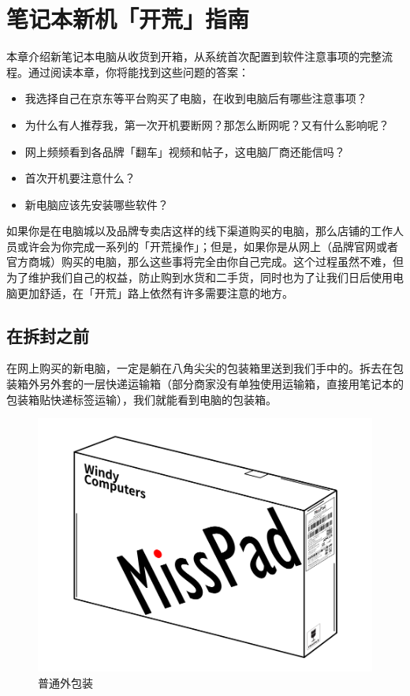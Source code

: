 \chapter{笔记本新机「开荒」指南}
\label{cha:new-laptop-setup}

\begin{intro}
  本章介绍新笔记本电脑从收货到开箱，从系统首次配置到软件注意事项的完整流程。通过阅读本章，你将能找到这些问题的答案：
  \begin{itemize}
    \item 我选择自己在京东等平台购买了电脑，在收到电脑后有哪些注意事项？
    \item 为什么有人推荐我，第一次开机要断网？那怎么断网呢？又有什么影响呢？
    \item 网上频频看到各品牌「翻车」视频和帖子，这电脑厂商还能信吗？
    \item 首次开机要注意什么？
    \item 新电脑应该先安装哪些软件？
  \end{itemize}
\end{intro}

如果你是在电脑城以及品牌专卖店这样的线下渠道购买的电脑，那么店铺的工作人员或许会为你完成一系列的「开荒操作」；但是，如果你是从网上（品牌官网或者官方商城）购买的电脑，那么这些事将完全由你自己完成。这个过程虽然不难，但为了维护我们自己的权益，防止购到水货和二手货，同时也为了让我们日后使用电脑更加舒适，在「开荒」路上依然有许多需要注意的地方。

\section{在拆封之前}

在网上购买的新电脑，一定是躺在八角尖尖的包装箱里送到我们手中的。拆去在包装箱外另外套的一层快递运输箱（部分商家没有单独使用运输箱，直接用笔记本的包装箱贴快递标签运输），我们就能看到电脑的包装箱。

\begin{figure}[htb!]
  \centering
  \includegraphics[width=.5\textwidth]{assets/appendix/Unboxing.png}
  \caption{普通外包装}
  \label{fig:Unboxing}
\end{figure}

